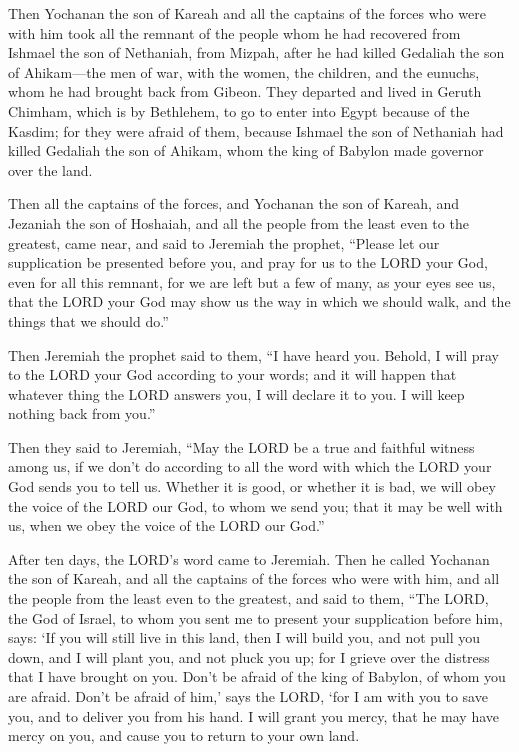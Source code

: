 \myverse{}Then Yochanan the son of Kareah and all the captains of the forces who were with him took all the remnant of the people whom he had recovered from Ishmael the son of Nethaniah, from Mizpah, after he had killed Gedaliah the son of Ahikam—the men of war, with the women, the children, and the eunuchs, whom he had brought back from Gibeon. \myverse{}They departed and lived in Geruth Chimham, which is by Bethlehem, to go to enter into Egypt \myverse{}because of the Kasdim; for they were afraid of them, because Ishmael the son of Nethaniah had killed Gedaliah the son of Ahikam, whom the king of Babylon made governor over the land.


\mychapter{} \myverse*{}Then all the captains of the forces, and Yochanan the son of Kareah, and Jezaniah the son of Hoshaiah, and all the people from the least even to the greatest, came near, \myverse{}and said to Jeremiah the prophet, “Please let our supplication be presented before you, and pray for us to the LORD your God, even for all this remnant, for we are left but a few of many, as your eyes see us, \myverse{}that the LORD your God may show us the way in which we should walk, and the things that we should do.”


\myverse{}Then Jeremiah the prophet said to them, “I have heard you. Behold, I will pray to the LORD your God according to your words; and it will happen that whatever thing the LORD answers you, I will declare it to you. I will keep nothing back from you.”


\myverse{}Then they said to Jeremiah, “May the LORD be a true and faithful witness among us, if we don’t do according to all the word with which the LORD your God sends you to tell us. \myverse{}Whether it is good, or whether it is bad, we will obey the voice of the LORD our God, to whom we send you; that it may be well with us, when we obey the voice of the LORD our God.”


\myverse{}After ten days, the LORD’s word came to Jeremiah. \myverse{}Then he called Yochanan the son of Kareah, and all the captains of the forces who were with him, and all the people from the least even to the greatest, \myverse{}and said to them, “The LORD, the God of Israel, to whom you sent me to present your supplication before him, says: \myverse{}‘If you will still live in this land, then I will build you, and not pull you down, and I will plant you, and not pluck you up; for I grieve over the distress that I have brought on you. \myverse{}Don’t be afraid of the king of Babylon, of whom you are afraid. Don’t be afraid of him,’ says the LORD, ‘for I am with you to save you, and to deliver you from his hand. \myverse{}I will grant you mercy, that he may have mercy on you, and cause you to return to your own land.


